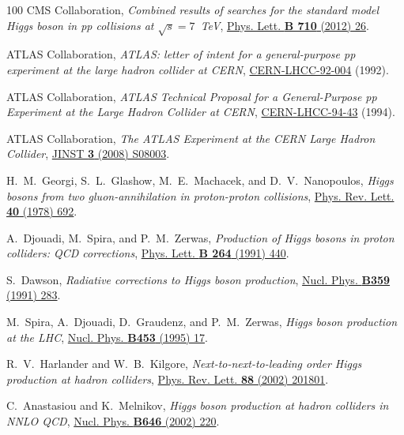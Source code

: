 \documentclass[final,3p,times,twocolumn]{elsarticle}
\begin{document}
\begin{thebibliography}{100}
{CMS Collaboration}, {\em {Combined results of searches for the standard model
  Higgs boson in pp collisions at $\sqrt{s} = 7$~TeV}},
  \href{http://dx.doi.org/10.1016/j.physletb.2012.02.064}{Phys. Lett.
  {\bfseries B 710} (2012) 26}.

{{ATLAS}} Collaboration, {\em ATLAS: letter of intent for a general-purpose pp
  experiment at the large hadron collider at CERN}, \href{http://cdsweb.cern.ch/record/291061}{CERN-LHCC-92-004} (1992).

{{ATLAS}} Collaboration, {\em ATLAS Technical Proposal
  for a General-Purpose pp Experiment at the Large Hadron Collider at CERN},
   \href{http://atlas.web.cern.ch/Atlas/TP/tp.html}{CERN-LHCC-94-43} (1994).

{ATLAS Collaboration}, {\em {The ATLAS Experiment at the CERN Large Hadron
  Collider}}, \href{http://dx.doi.org/10.1088/1748-0221/3/08/S08003}{JINST
  {\bfseries 3} (2008) S08003}.

H.~M.~Georgi, S.~L.~Glashow, M.~E.~Machacek, and D.~V.~Nanopoulos, {\em {Higgs bosons
  from two gluon-annihilation in proton-proton collisions}},
  \href{http://dx.doi.org/10.1103/PhysRevLett.40.692}{Phys. Rev. Lett.
  {\bfseries 40} (1978) 692}.

A.~Djouadi, M.~Spira, and P.~M.~Zerwas, {\em {Production of Higgs bosons in
  proton colliders: QCD corrections}},
  \href{http://dx.doi.org/10.1016/0370-2693(91)90375-Z}{Phys. Lett.
  {\bfseries B 264} (1991) 440}.

{S.~Dawson}, {\em {Radiative corrections to Higgs boson production}},
  \href{http://dx.doi.org/10.1016/0550-3213(91)90061-2}{Nucl. Phys. {\bfseries
  B359} (1991) 283}.

M.~Spira, A.~Djouadi, D.~Graudenz, and P.~M.~Zerwas, {\em {Higgs boson
  production at the LHC}},
  \href{http://dx.doi.org/10.1016/0550-3213(95)00379-7}{Nucl. Phys. {\bfseries
  B453} (1995) 17}.

{R.~V.~Harlander and W.~B.~Kilgore}, {\em {Next-to-next-to-leading order Higgs
  production at hadron colliders}},
  \href{http://dx.doi.org/10.1103/PhysRevLett.88.201801}{Phys. Rev. Lett.
  {\bfseries 88} (2002) 201801}.

C.~Anastasiou and K.~Melnikov, {\em {Higgs boson production at hadron colliders
  in NNLO QCD}}, \href{http://dx.doi.org/10.1016/S0550-3213(02)00837-4}{Nucl.
  Phys. {\bfseries B646} (2002) 220}.


\end{thebibliography}
\end{document}
